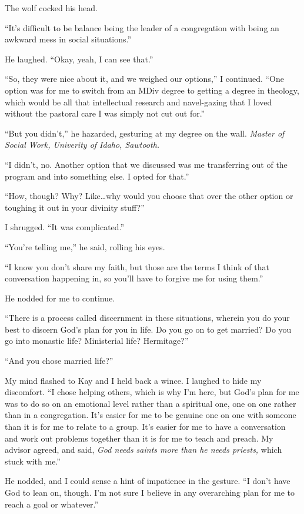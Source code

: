 The wolf cocked his head.

``It's difficult to be balance being the leader of a congregation with being an awkward mess in social situations.''

He laughed. ``Okay, yeah, I can see that.''

``So, they were nice about it, and we weighed our options,'' I continued. ``One option was for me to switch from an MDiv degree to getting a degree in theology, which would be all that intellectual research and navel-gazing that I loved without the pastoral care I was simply not cut out for.''

``But you didn't,'' he hazarded, gesturing at my degree on the wall. \emph{Master of Social Work, Univerity of Idaho, Sawtooth.}

``I didn't, no. Another option that we discussed was me transferring out of the program and into something else. I opted for that.''

``How, though? Why? Like\ldots why would you choose that over the other option or toughing it out in your divinity stuff?''

I shrugged. ``It was complicated.''

``You're telling me,'' he said, rolling his eyes.

``I know you don't share my faith, but those are the terms I think of that conversation happening in, so you'll have to forgive me for using them.''

He nodded for me to continue.

``There is a process called discernment in these situations, wherein you do your best to discern God's plan for you in life. Do you go on to get married? Do you go into monastic life? Ministerial life? Hermitage?''

``And you chose married life?''

My mind flashed to Kay and I held back a wince. I laughed to hide my discomfort. ``I chose helping others, which is why I'm here, but God's plan for me was to do so on an emotional level rather than a spiritual one, one on one rather than in a congregation. It's easier for me to be genuine one on one with someone than it is for me to relate to a group. It's easier for me to have a conversation and work out problems together than it is for me to teach and preach. My advisor agreed, and said, \emph{God needs saints more than he needs priests,} which stuck with me.''

He nodded, and I could sense a hint of impatience in the gesture. ``I don't have God to lean on, though. I'm not sure I believe in any overarching plan for me to reach a goal or whatever.''

